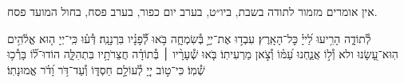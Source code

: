 \documentclass[twoside, openany, parskip=half, 11pt]{book}
\begin{document}
\begin{narrow}
\begin{scriptsize} %
\textsf{
אין אומרים מזמור לתודה בשבת, ביו״ט, בערב יום כפור, בערב פסח, בחול המועד פסח.\\
}\end{scriptsize}
 לְ֯תוֹדָ֑ה
הָרִ֥יעוּ לַ֝ייָ֗ כׇּל־הָאָֽרֶץ׃
עִבְד֣וּ אֶת־יְיָ֣ בְּ֯שִׂמְחָ֑ה בֹּ֥אוּ לְ֯֝פָנָ֗יו בִּרְנָנָֽה׃
דְּ֯ע֗וּ כִּֽי־יְיָ ה֤וּא אֱלֹ֫הִ֥ים הֽוּא־עָ֭שָׂנוּ ולא וְ֯ל֣וֹ אֲנַ֑חְנוּ עַ֝מּ֗וֹ וְ֯צֹ֣אן מַרְעִיתֽוֹ׃
בֹּ֤אוּ שְׁ֯עָרָ֨יו ׀ בְּ֯תוֹדָ֗ה חֲצֵרֹתָ֥יו בִּתְהִלָּ֑ה הוֹדוּ־ל֗֝וֹ בָּרְ֯כ֥וּ שְׁ֯מֽוֹ׃
כִּי־ט֣וֹב יְיָ֭ לְ֯עוֹלָ֣ם חַסְדּ֑וֹ וְ֯עַד־דֹּ֥ר וָ֝דֹ֗ר אֱמוּנָתֽוֹ׃
\end{narrow}
\end{document}
